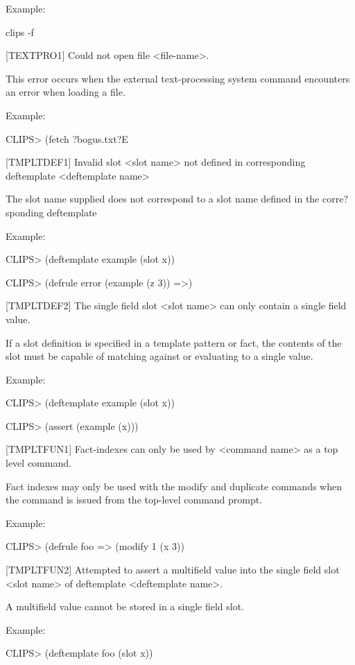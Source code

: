 \documentclass[letterpaper,10pt,english]{sphinxmanual}
\begin{document}
Example:

clips -f

{[}TEXTPRO1{]} Could not open file \textless{}file-name\textgreater{}.

This error occurs when the external text-processing system command
 encounters an error when loading a file.

Example:

CLIPS\textgreater{} (fetch ?bogus.txt?E

{[}TMPLTDEF1{]} Invalid slot \textless{}slot name\textgreater{} not defined in corresponding
deftemplate \textless{}deftemplate name\textgreater{}

The slot name supplied does not correspond to a slot name defined in the
corre?sponding deftemplate

Example:

CLIPS\textgreater{} (deftemplate example (slot x))

CLIPS\textgreater{} (defrule error (example (z 3)) =\textgreater{})

{[}TMPLTDEF2{]} The single field slot \textless{}slot name\textgreater{} can only contain a single
field value.

If a slot definition is specified in a template pattern or fact, the
contents of the slot must be capable of matching against or evaluating
to a single value.

Example:

CLIPS\textgreater{} (deftemplate example (slot x))

CLIPS\textgreater{} (assert (example (x)))

{[}TMPLTFUN1{]} Fact-indexes can only be used by \textless{}command name\textgreater{} as a top
level command.

Fact indexes may only be used with the modify and duplicate commands
when the command is issued from the top-level command prompt.

Example:

CLIPS\textgreater{} (defrule foo =\textgreater{} (modify 1 (x 3))

{[}TMPLTFUN2{]} Attempted to assert a multifield value into the single field
slot \textless{}slot name\textgreater{} of deftemplate \textless{}deftemplate name\textgreater{}.

A multifield value cannot be stored in a single field slot.

Example:

CLIPS\textgreater{} (deftemplate foo (slot x))
\end{document}

